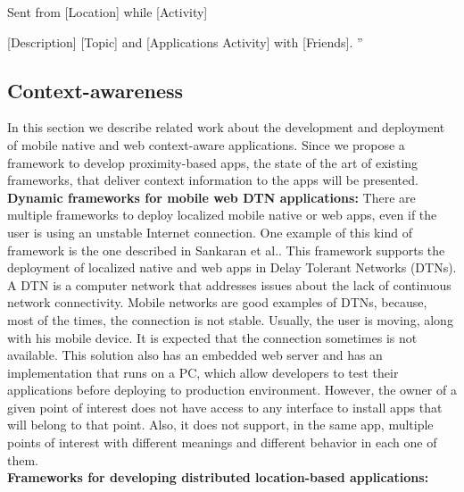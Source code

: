 Sent from [Location] while [Activity]

[Description] [Topic] and [Applications Activity] with
[Friends].
''
\\
\subsection{Context-awareness}
\label{sub:frameworks_context_aware}
In this section we describe related work about the
development and deployment of mobile native and web
context-aware applications.
Since we propose a framework to develop
proximity-based apps, the state
of the art of existing frameworks, that deliver
context information to the apps will be presented.
\\
\textbf{Dynamic frameworks for
mobile web DTN applications:}
There are multiple frameworks to deploy localized
mobile native or web apps, even if the user is using an
unstable Internet connection. One example of this
kind of framework is the one
described in Sankaran et al.\cite{Sankaran2014}.
This framework supports the deployment of localized
native and
web apps in Delay Tolerant Networks (DTNs).
A DTN is a computer network that
addresses issues about the lack of continuous network
connectivity.
Mobile networks are good examples of DTNs,
because, most of the times, the connection is not stable.
Usually, the user is moving, along with his mobile
device.
It is expected that the connection sometimes is not
available.
This solution also has an embedded web server
and has an implementation that runs on a PC, which allow
developers to test their applications before deploying
to production environment.
However, the owner of a given point of interest does not
have access to any interface to install apps that will
belong to that point. Also, it does not support, in the
same app, multiple points of interest with different
meanings and different behavior in each one of them.
\\
\textbf{Frameworks for developing distributed
location-based applications:}
